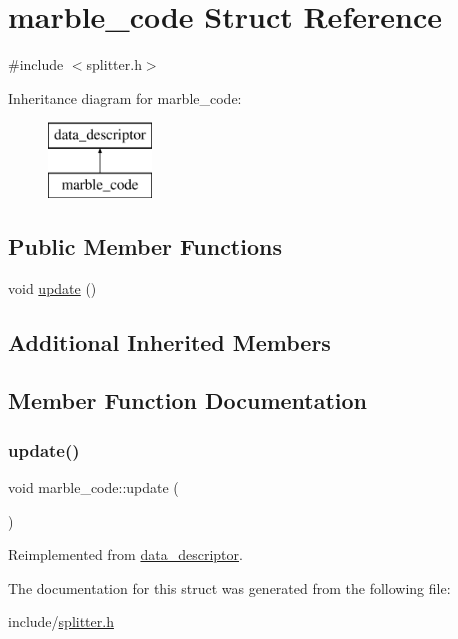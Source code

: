 \hypertarget{structmarble__code}{}\section{marble\+\_\+code Struct Reference}
\label{structmarble__code}


{\ttfamily \#include $<$splitter.\+h$>$}

Inheritance diagram for marble\+\_\+code\+:\begin{figure}[H]
\begin{center}
\leavevmode
\includegraphics[height=2.000000cm]{structmarble__code}
\end{center}
\end{figure}
\subsection*{Public Member Functions}
\begin{DoxyCompactItemize}
\item 
void \hyperlink{structmarble__code_ac2d593b81e3f340f11e8fe6b8978163b}{update} ()
\end{DoxyCompactItemize}
\subsection*{Additional Inherited Members}


\subsection{Member Function Documentation}
\mbox{\label{structmarble__code_ac2d593b81e3f340f11e8fe6b8978163b}} 
\subsubsection{\texorpdfstring{update()}{update()}}
{\footnotesize\ttfamily void marble\+\_\+code\+::update (\begin{DoxyParamCaption}{ }\end{DoxyParamCaption})\hspace{0.3cm}{\ttfamily [virtual]}}



Reimplemented from \hyperlink{structdata__descriptor_ad6cd92beb7d2b9291e0d130a24faa380}{data\+\_\+descriptor}.



The documentation for this struct was generated from the following file\+:\begin{DoxyCompactItemize}
\item 
include/\hyperlink{splitter_8h}{splitter.\+h}\end{DoxyCompactItemize}
